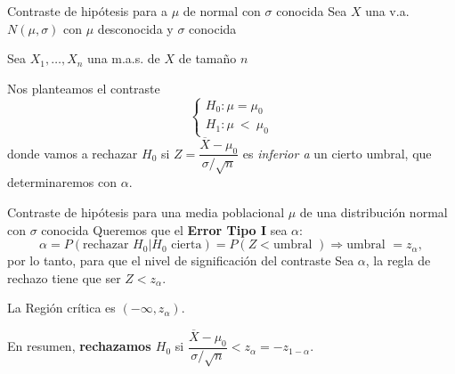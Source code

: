\documentclass[
  ignorenonframetext,
]{beamer}
\begin{document}
\begin{frame}{Contraste de hipótesis para a \(\mu\) de normal con
\(\sigma\) conocida}
\protect\hypertarget{contraste-de-hipuxf3tesis-para-a-mu-de-normal-con-sigma-conocida}{}
Sea \(X\) una v.a. \(N(\mu,\sigma)\) con \(\mu\) desconocida y
\(\sigma\) conocida

Sea \(X_1,\ldots,X_{n}\) una m.a.s. de \(X\) de tamaño \(n\)

Nos planteamos el contraste \[
\left\{\begin{array}{l}
H_0:\mu=\mu_0\\ H_1:\mu\ <\ \mu_0
\end{array}
\right.
\] donde vamos a rechazar \(H_0\) si
\(Z=\dfrac{\overline{X}-\mu_0}{{\sigma}/{\sqrt{n}}}\) es \emph{inferior
a} un cierto umbral, que determinaremos con \(\alpha\).
\end{frame}

\begin{frame}{Contraste de hipótesis para una media poblacional \(\mu\)
de una distribución normal con \(\sigma\) conocida}
\protect\hypertarget{contraste-de-hipuxf3tesis-para-una-media-poblacional-mu-de-una-distribuciuxf3n-normal-con-sigma-conocida}{}
Queremos que el \textbf{Error Tipo I} sea \(\alpha\): \[
\alpha  =P(\mbox{rechazar } H_0| H_0 \mbox{ cierta})
 =P(Z<\mbox{umbral })\Longrightarrow \mbox{umbral }=z_{\alpha},
\] por lo tanto, para que el nivel de significación del contraste Sea
\(\alpha\), la regla de rechazo tiene que ser \(Z<z_{\alpha}\).

La Región crítica es \((-\infty,z_{\alpha})\).

En resumen, \textbf{rechazamos \(H_0\)} si
\(\dfrac{\overline{X}-\mu_{0}}{\sigma/\sqrt{n}} < z_{\alpha}=-z_{1-\alpha}\).
\end{frame}
\end{document}
